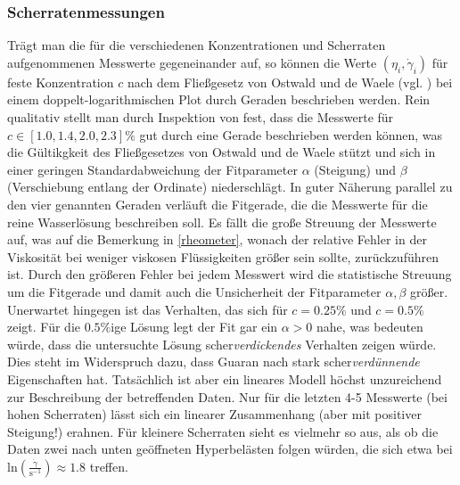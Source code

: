\documentclass[11pt,a4paper,oneside]{scrartcl}
\begin{document}
\subsubsection{Scherratenmessungen}\label{guar_mess}
Trägt man die für die verschiedenen Konzentrationen und Scherraten aufgenommenen Messwerte gegeneinander auf, so können die Werte $(\eta_i,\dot\gamma_i)$ für feste Konzentration $c$ nach dem Fließgesetz von Ostwald und de Waele (vgl. \cite{dewiki:192899581}) bei einem doppelt-logarithmischen Plot durch Geraden beschrieben werden. 
Rein qualitativ stellt man durch Inspektion von  fest, dass die Messwerte für $c\in[1.0,1.4,2.0,2.3]\%$ gut durch eine Gerade beschrieben werden können, was die Gültikgkeit des Fließgesetzes von Ostwald und de Waele stützt und sich in einer geringen Standardabweichung der Fitparameter $\alpha$ (\glqq Steigung\grqq) und $\beta$ (\glqq Verschiebung entlang der Ordinate\grqq) niederschlägt. In guter Näherung parallel zu den vier genannten Geraden verläuft die Fitgerade, die die Messwerte für die reine Wasserlösung beschreiben soll. Es fällt die große Streuung der Messwerte auf, was auf die Bemerkung in \ref{rheometer}, wonach der relative Fehler in der Viskosität bei weniger viskosen Flüssigkeiten größer sein sollte, zurückzuführen ist. Durch den größeren Fehler bei jedem Messwert wird die statistische Streuung um die Fitgerade und damit auch die Unsicherheit der Fitparameter $\alpha,\beta$ größer. \\
Unerwartet hingegen ist das Verhalten, das sich für $c=0.25\%$ und $c=0.5\%$ zeigt. Für die $0.5\%$ige Lösung legt der Fit gar ein $\alpha>0$ nahe, was bedeuten würde, dass die untersuchte Lösung scher\emph{verdickendes} Verhalten zeigen würde.  Dies steht im Widerspruch dazu, dass Guaran nach \cite{enwiki:1124053245} stark scher\emph{verdünnende} Eigenschaften hat. 
Tatsächlich ist aber ein lineares Modell höchst unzureichend zur Beschreibung der betreffenden Daten. Nur für die letzten 4-5 Messwerte (bei hohen Scherraten) lässt sich ein linearer Zusammenhang (aber mit positiver Steigung!) erahnen.  Für kleinere Scherraten sieht es vielmehr so aus, als ob die Daten zwei nach unten geöffneten Hyperbelästen folgen würden, die sich etwa bei $\mathrm{ln}\left(\frac{\dot\gamma}{\mathrm{s}^{-1}}\right)\approx 1.8$ treffen. 
\end{document}
